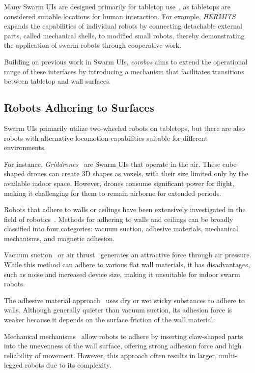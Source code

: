Many Swarm UIs are designed primarily for tabletop use~\cite{Reactile2018,ShapeBots2019,Hiraki2016,disappearables2022,HERMITS2020}, as tabletops are considered suitable locations for human interaction.
For example, \textit{HERMITS}~\cite{HERMITS2020} expands the capabilities of individual robots by connecting detachable external parts, called mechanical shells, to modified small robots, thereby demonstrating the application of swarm robots through cooperative work.

Building on previous work in Swarm UIs, \textit{corobos} aims to extend the operational range of these interfaces by introducing a mechanism that facilitates transitions between tabletop and wall surfaces.


\subsection{Robots Adhering to Surfaces}
Swarm UIs primarily utilize two-wheeled robots on tabletops, but there are also robots with alternative locomotion capabilities suitable for different environments.

For instance, \textit{Griddrones}~\cite{Griddrones2018} are Swarm UIs that operate in the air.
These cube-shaped drones can create 3D shapes as voxels, with their size limited only by the available indoor space.
However, drones consume significant power for flight, making it challenging for them to remain airborne for extended periods.

Robots that adhere to walls or ceilings have been extensively investigated in the field of robotics~\cite{Inoue2006,Ahmed2022,Panich2010,Tripillar2011}.
Methods for adhering to walls and ceilings can be broadly classified into four categories: vacuum suction, adhesive materials, mechanical mechanisms, and magnetic adhesion.

Vacuum suction~\cite{Panich2010,suctioncup2010,EpidermalRobots} or air thrust~\cite{Vertigo2015} generates an attractive force through air pressure.
While this method can adhere to various flat wall materials, it has disadvantages, such as noise and increased device size, making it unsuitable for indoor swarm robots.

The adhesive material approach~\cite{Waalbot2007,Kim2008,Yan2021,HawkesGeckoHuman2015} uses dry or wet sticky substances to adhere to walls.
Although generally quieter than vacuum suction, its adhesion force is weaker because it depends on the surface friction of the wall material.

Mechanical mechanisms~\cite{Inoue2006,CLASH2011} allow robots to adhere by inserting claw-shaped parts into the unevenness of the wall surface, offering strong adhesion force and high reliability of movement.
However, this approach often results in larger, multi-legged robots due to its complexity.

